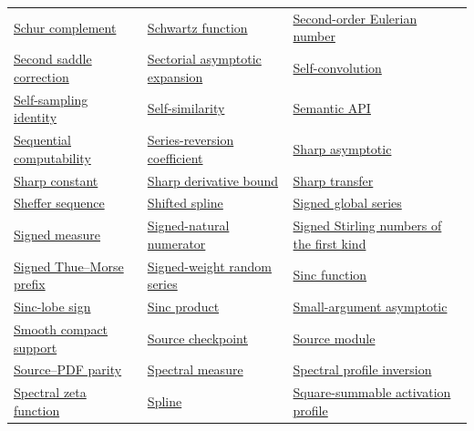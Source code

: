 \documentclass[11pt,oneside]{article}
\begin{document}
\begin{longtable}{L{0.31\textwidth}L{0.31\textwidth}L{0.31\textwidth}}
\hyperlink{gls:schur-complement}{Schur complement} & \hyperlink{gls:schwartz-function}{Schwartz function} & \hyperlink{gls:second-order-eulerian-number}{Second-order Eulerian number} \\
\hyperlink{gls:second-saddle-correction}{Second saddle correction} & \hyperlink{gls:sectorial-asymptotic-expansion}{Sectorial asymptotic expansion} & \hyperlink{gls:self-convolution}{Self-convolution} \\
\hyperlink{gls:self-sampling-identity}{Self-sampling identity} & \hyperlink{gls:self-similarity}{Self-similarity} & \hyperlink{gls:semantic-api}{Semantic API} \\
\hyperlink{gls:sequential-computability}{Sequential computability} & \hyperlink{gls:series-reversion-coefficient}{Series-reversion coefficient} & \hyperlink{gls:sharp-asymptotic}{Sharp asymptotic} \\
\hyperlink{gls:sharp-constant}{Sharp constant} & \hyperlink{gls:sharp-derivative-bound}{Sharp derivative bound} & \hyperlink{gls:sharp-transfer}{Sharp transfer} \\
\hyperlink{gls:sheffer-sequence}{Sheffer sequence} & \hyperlink{gls:shifted-spline}{Shifted spline} & \hyperlink{gls:signed-global-series}{Signed global series} \\
\hyperlink{gls:signed-measure}{Signed measure} & \hyperlink{gls:signed-natural-numerator}{Signed-natural numerator} & \hyperlink{gls:signed-stirling-first-kind}{Signed Stirling numbers of the first kind} \\
\hyperlink{gls:signed-thue-morse-prefix}{Signed Thue--Morse prefix} & \hyperlink{gls:signed-weight-random-series}{Signed-weight random series} & \hyperlink{gls:sinc-function}{Sinc function} \\
\hyperlink{gls:sinc-lobe-sign}{Sinc-lobe sign} & \hyperlink{gls:sinc-product}{Sinc product} & \hyperlink{gls:small-argument-asymptotic}{Small-argument asymptotic} \\
\hyperlink{gls:smooth-compact-support}{Smooth compact support} & \hyperlink{gls:source-checkpoint}{Source checkpoint} & \hyperlink{gls:source-module}{Source module} \\
\hyperlink{gls:source-pdf-parity}{Source--PDF parity} & \hyperlink{gls:spectral-measure}{Spectral measure} & \hyperlink{gls:spectral-profile-inversion}{Spectral profile inversion} \\
\hyperlink{gls:spectral-zeta-function}{Spectral zeta function} & \hyperlink{gls:spline}{Spline} & \hyperlink{gls:square-summable-activation}{Square-summable activation profile} \\

\end{longtable}
\end{document}
